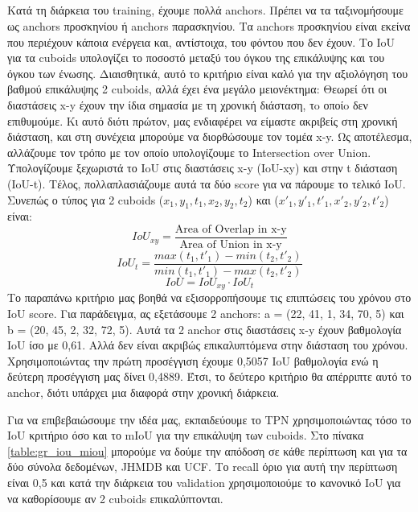 \subsection{ }
Κατά τη διάρκεια του \en training\gr, έχουμε πολλά \en anchors\gr. Πρέπει να τα ταξινομήσουμε ως \en anchors  \gr προσκηνίου ή
\en anchors \gr παρασκηνίου. Τα \en anchors \gr προσκηνίου είναι εκείνα που περιέχουν κάποια ενέργεια και, αντίστοιχα, του φόντου
που δεν έχουν. Tο \en IoU \gr για τα \en cuboids \gr υπολογίζει το ποσοστό μεταξύ του όγκου της επικάλυψης
και του όγκου των ένωσης.
Διαισθητικά, αυτό το κριτήριο είναι καλό για την αξιολόγηση του βαθμού επικάλυψης 2 \en cuboids\gr, αλλά έχει ένα μεγάλο μειονέκτημα:
Θεωρεί ότι οι διαστάσεις \en x-y \gr έχουν την ίδια σημασία με τη χρονική διάσταση, τo οποίo δεν επιθυμούμε. Κι αυτό  διότι
πρώτον, μας ενδιαφέρει να είμαστε ακριβείς στη χρονική διάσταση, και στη συνέχεια μπορούμε να διορθώσουμε τον τομέα \en x-y\gr.
Ως αποτέλεσμα, αλλάζουμε τον τρόπο με τον οποίο υπολογίζουμε το \en Intersection over Union\gr. Υπολογίζουμε ξεχωριστά
το \en IoU \gr στις διαστάσεις \en x-y (IoU-xy) \gr και στην \en t \gr  διάσταση \en (IoU-t)\gr. Τέλος,  πολλαπλασιάζουμε αυτά τα δύο \en score
 \gr για να πάρουμε το τελικό \en IoU\gr.
Συνεπώς ο τύπος για 2 \en cuboids ($x_1, y_1, t_1, x_2, y_2, t_2$) \gr  και \en  ($x'_1, y'_1, t'_1, x'_2, y'_2, t'_2$) \gr είναι:\en
\[ IoU_{xy} = \frac{ \text{Area of Overlap in x-y}} { \text{Area of Union in x-y}}  \]
\[ IoU_t = \frac { max(t_1, t'_1) - min(t_2, t'_2)} {min(t_1,t'_1) - max(t_2,t'_2)} \]
\[ IoU = IoU_{xy} \cdot  IoU_t \]
\gr Το παραπάνω κριτήριο μας βοηθά να εξισορροπήσουμε τις επιπτώσεις του χρόνου στο \en IoU score\gr. Για παράδειγμα, ας εξετάσουμε 2 \en anchors\gr:
\en a = (22, 41, 1, 34, 70, 5) \gr και \en  b = (20, 45, 2, 32, 72, 5)\gr. Αυτά τα 2 \en anchor \gr στις διαστάσεις \en  x-y \gr έχουν βαθμολογία \en IoU \gr ίσο με 0,61.
Αλλά δεν είναι ακριβώς επικαλυπτόμενα στην διάσταση του χρόνου. Χρησιμοποιώντας την πρώτη προσέγγιση έχουμε 0,5057 \en IoU \gr βαθμολογία ενώ η
δεύτερη προσέγγιση μας δίνει 0,4889. Έτσι, το δεύτερο κριτήριο θα απέρριπτε αυτό το \en  anchor\gr, διότι υπάρχει μια διαφορά στην χρονική διάρκεια. \par


Για να επιβεβαιώσουμε την ιδέα μας, εκπαιδεύουμε το \en TPN \gr χρησιμοποιώντας τόσο το \en IoU \gr κριτήριο όσο και το \en mIoU \gr  για την επικάλυψη των \en cuboids\gr.
Στο πίνακα \ref{table:gr_iou_miou} μπορούμε να δούμε την απόδοση σε κάθε περίπτωση και για τα δύο σύνολα δεδομένων, \en JHMDB \gr και \en UCF\gr. Το \en recall \gr όριο για αυτή
την περίπτωση είναι 0,5 και κατά την διάρκεια του \en validation \gr χρησιμοποιούμε το κανονικό \en IoU \gr για να καθορίσουμε αν 2 \en cuboids \gr επικαλύπτονται.

